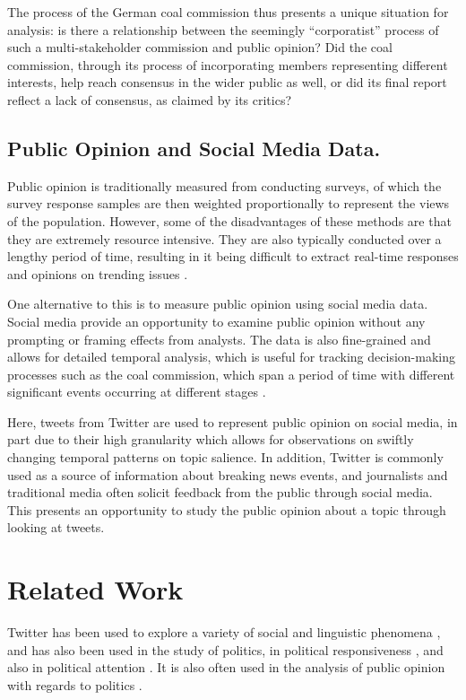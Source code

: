 \documentclass[12pt,onecolumn,twoside]{layout}
\begin{document}
The process of the German coal commission thus presents a unique situation for analysis: is there a relationship between the seemingly ``corporatist'' process of such a multi-stakeholder commission and public opinion? Did the coal commission, through its process of incorporating members representing different interests, help reach consensus in the wider public as well, or did its final report reflect a lack of consensus, as claimed by its critics?

\subsection*{Public Opinion and Social Media Data.} %
Public opinion is traditionally measured from conducting surveys, of which the survey response samples are then weighted proportionally to represent the views of the population. However, some of the disadvantages of these methods are that they are extremely resource intensive. They are also typically conducted over a lengthy period of time, resulting in it being difficult to extract real-time responses and opinions on trending issues \citep{Klasnja2018}.

One alternative to this is to measure public opinion using social media data. Social media provide an opportunity to examine public opinion without any prompting or framing effects from analysts. The data is also fine-grained and allows for detailed temporal analysis, which is useful for tracking decision-making processes such as the coal commission, which span a period of time with different significant events occurring at different stages \citep{Klasnja2018}.

Here, tweets from Twitter are used to represent public opinion on social media, in part due to their high granularity which allows for observations on swiftly changing temporal patterns on topic salience. In addition, Twitter is commonly used as a source of information about breaking news events, and journalists and traditional media often solicit feedback from the public through social media. This presents an opportunity to study the public opinion about a topic through looking at tweets.

\section{Related Work} \label{sec:relatedwork}
Twitter has been used to explore a variety of social and linguistic phenomena \citep{Cao2012, Lin2013, Lin2014}, and has also been used in the study of politics, in political responsiveness \citep{Barbera2019}, and also in political attention \citep{Hemphill2014, Shapiro2017}. It is also often used in the analysis of public opinion with regards to politics \citep{DiGrazia2013, Vaccari2013, Barbera2019}.
\end{document}
